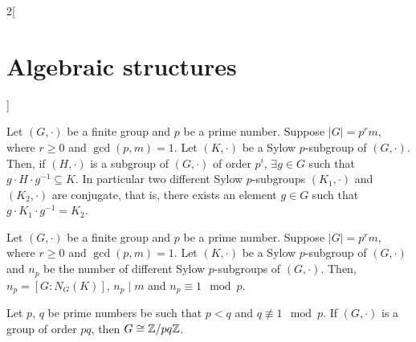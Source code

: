 \documentclass[../../../main_math.tex]{subfiles}
\begin{document}
\begin{multicols}{2}[\section{Algebraic structures}]
\begin{definition}
  \end{definition}
  \begin{theorem}
    Let $(G,\cdot)$ be a finite group and $p$ be a prime number. Suppose $|G|=p^r m$, where $r\geq 0$ and $\gcd(p,m)=1$. Let $(K,\cdot)$ be a Sylow $p$-subgroup of $(G,\cdot)$. Then, if $(H,\cdot)$ is a subgroup of $(G,\cdot)$ of order $p^i$, $\exists g\in G$ such that $g\cdot H\cdot g^{-1}\subseteq K$. In particular two different Sylow $p$-subgroups $(K_1,\cdot)$ and $(K_2,\cdot)$ are conjugate, that is, there exists an element $g\in G$ such that $g\cdot K_1\cdot g^{-1}=K_2$.
  \end{theorem}
  \begin{theorem}
    Let $(G,\cdot)$ be a finite group and $p$ be a prime number. Suppose $|G|=p^r m$, where $r\geq 0$ and $\gcd(p,m)=1$. Let $(K,\cdot)$ be a Sylow $p$-subgroup of $(G,\cdot)$ and $n_p$ be the number of different Sylow $p$-subgroups of $(G,\cdot)$. Then, $n_p=[G:N_G(K)]$, $n_p\mid m$ and $n_p\equiv1\mod p$.
  \end{theorem}
  \begin{corollary}
    Let $p$, $q$ be prime numbers be such that $p<q$ and $q\not\equiv 1\mod p$. If $(G,\cdot)$ is a group of order $pq$, then $G\cong\quot{\ZZ}{pq\ZZ}$.
  \end{corollary}

\end{multicols}
\end{document}
